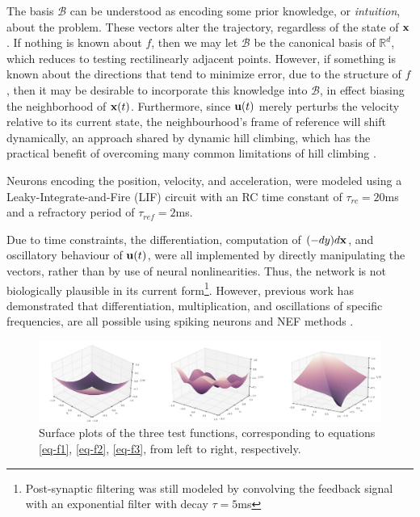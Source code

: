 \documentclass[letterpaper, 10 pt, conference]{ieeeconf}  %
\newcommand{\bolds}[1]{{\bf #1}}
\begin{document}
The basis $\mathcal{B}$ can be understood as encoding some prior knowledge, or {\it intuition}, about the problem. These vectors alter the trajectory, regardless of the state of $\bolds{x}$. If nothing is known about $f$, then we may let $\mathcal{B}$ be the canonical basis of $\mathbb{R}^d$, which reduces to testing rectilinearly adjacent points. However, if something is known about the directions that tend to minimize error, due to the structure of $f$, then it may be desirable to incorporate this knowledge into $\mathcal{B}$, in effect biasing the neighborhood of $\bolds{x}(t)$. Furthermore, since $\bolds{u}(t)$ merely perturbs the velocity relative to its current state, the neighbourhood's frame of reference will shift dynamically, an approach shared by dynamic hill climbing, which has the practical benefit of overcoming many common limitations of hill climbing \cite{yuret1993dynamic}.

Neurons encoding the position, velocity, and acceleration, were modeled using a Leaky-Integrate-and-Fire (LIF) circuit with an RC time constant of $\tau_{rc} = 20$ms and a refractory period of $\tau_{ref} = 2$ms.  

Due to time constraints, the differentiation, computation of $(-dy)d\bolds{x}$, and oscillatory behaviour of $\bolds{u}(t)$, were all implemented by directly manipulating the vectors, rather than by use of neural nonlinearities. Thus, the network is not biologically plausible in its current form\footnote{Post-synaptic filtering was still modeled by convolving the feedback signal with an exponential filter with decay $\tau = 5$ms}. However, previous work has demonstrated that differentiation, multiplication, and oscillations of specific frequencies, are all possible using spiking neurons and NEF methods \cite{tripp2010, huzook2012}.


\begin{figure}[ht]
  \centering
  \includegraphics[width=1.0\textwidth]{functions.png}
  \caption{Surface plots of the three test functions, corresponding to equations \ref{eq-f1}, \ref{eq-f2}, \ref{eq-f3}, from left to right, respectively.}
\end{figure}
\end{document}
